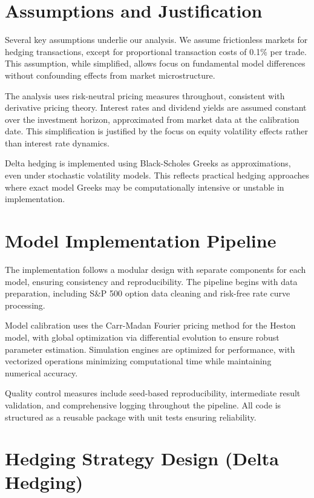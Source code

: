 \documentclass[12pt,a4paper]{report}
\begin{document}
\section{Assumptions and Justification}

Several key assumptions underlie our analysis. We assume frictionless markets for hedging transactions, except for proportional transaction costs of 0.1\% per trade. This assumption, while simplified, allows focus on fundamental model differences without confounding effects from market microstructure.

The analysis uses risk-neutral pricing measures throughout, consistent with derivative pricing theory. Interest rates and dividend yields are assumed constant over the investment horizon, approximated from market data at the calibration date. This simplification is justified by the focus on equity volatility effects rather than interest rate dynamics.

Delta hedging is implemented using Black-Scholes Greeks as approximations, even under stochastic volatility models. This reflects practical hedging approaches where exact model Greeks may be computationally intensive or unstable in implementation.

\section{Model Implementation Pipeline}

The implementation follows a modular design with separate components for each model, ensuring consistency and reproducibility. The pipeline begins with data preparation, including S\&P 500 option data cleaning and risk-free rate curve processing.

Model calibration uses the Carr-Madan Fourier pricing method for the Heston model, with global optimization via differential evolution to ensure robust parameter estimation. Simulation engines are optimized for performance, with vectorized operations minimizing computational time while maintaining numerical accuracy.

Quality control measures include seed-based reproducibility, intermediate result validation, and comprehensive logging throughout the pipeline. All code is structured as a reusable package with unit tests ensuring reliability.

\section{Hedging Strategy Design (Delta Hedging)}
\end{document}
